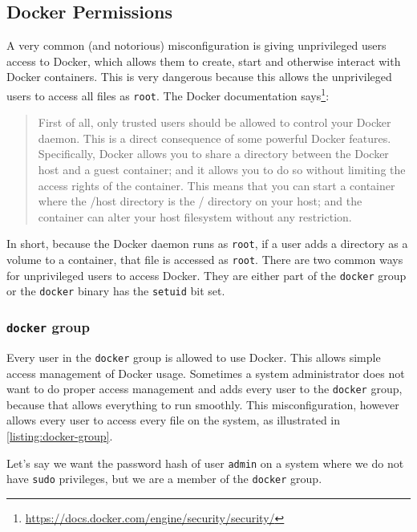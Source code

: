 \subsection{Docker Permissions}\label{subsection:docker-permissions}
A very common (and notorious) misconfiguration is giving unprivileged users access to Docker, which allows them to create, start and otherwise interact with Docker containers. This is very dangerous because this allows the unprivileged users to access all files as \lstinline{root}. The Docker documentation says\footnote{\url{https://docs.docker.com/engine/security/security/}}:
\begin{quote}
First of all, only trusted users should be allowed to control your Docker daemon. This is a direct consequence of some powerful Docker features. Specifically, Docker allows you to share a directory between the Docker host and a guest container; and it allows you to do so without limiting the access rights of the container. This means that you can start a container where the /host directory is the / directory on your host; and the container can alter your host filesystem without any restriction.
\end{quote}

In short, because the Docker daemon runs as \lstinline{root}, if a user adds a directory as a volume to a container, that file is accessed as \lstinline{root}. There are two common ways for unprivileged users to access Docker. They are either part of the \lstinline{docker} group or the \lstinline{docker} binary has the \lstinline{setuid} bit set.

\subsubsection{\texorpdfstring{\lstinline{docker}}{docker} group}
Every user in the \lstinline{docker} group is allowed to use Docker. This allows simple access management of Docker usage. Sometimes a system administrator does not want to do proper access management and adds every user to the \lstinline{docker} group, because that allows everything to run smoothly. This misconfiguration, however allows every user to access every file on the system, as illustrated in \autoref{listing:docker-group}.

\hfill

Let's say we want the password hash of user \lstinline{admin} on a system where we do not have \lstinline{sudo} privileges, but we are a member of the \lstinline{docker} group.

